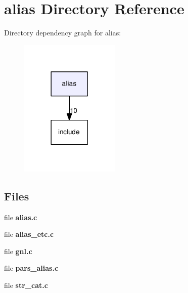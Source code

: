 \section{alias Directory Reference}
\label{dir_4ac3aefb9d9c4a22cf23f594cbf57925}
Directory dependency graph for alias\-:\nopagebreak
\begin{figure}[H]
\begin{center}
\leavevmode
\includegraphics[width=134pt]{dir_4ac3aefb9d9c4a22cf23f594cbf57925_dep}
\end{center}
\end{figure}
\subsection*{Files}
\begin{DoxyCompactItemize}
\item 
file {\bf alias.\-c}
\item 
file {\bf alias\-\_\-etc.\-c}
\item 
file {\bf gnl.\-c}
\item 
file {\bf pars\-\_\-alias.\-c}
\item 
file {\bf str\-\_\-cat.\-c}
\end{DoxyCompactItemize}
